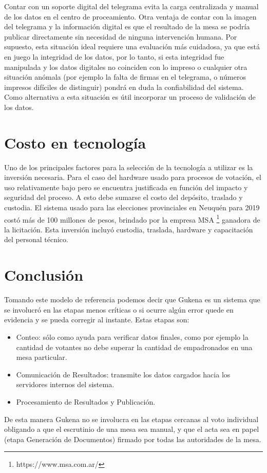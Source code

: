 Contar con un soporte digital del telegrama evita la carga centralizada y manual de los datos en el centro de proceamiento. Otra ventaja de contar con la imagen del telegrama y la información digital es que el resultado de la mesa se podría publicar directamente sin necesidad de ninguna intervención humana. Por supuesto, esta situación ideal requiere una evaluación más cuidadosa, ya que está en juego la integridad de los datos, por lo tanto, si esta integridad fue manipulada y los datos digitales no coinciden con lo impreso o cualquier otra situación anómala (por ejemplo la falta de firmas en el telegrama, o números impresos difíciles de distinguir) pondrá en duda la confiabilidad del sistema. Como alternativa a esta situación es útil incorporar un proceso de validación de los datos.


\section{Costo en tecnología}
Uno de los principales factores para la selección de la tecnología a utilizar es la inversión necesaria. Para el caso del hardware usado para procesos de votación, el uso relativamente bajo pero se encuentra justificada en función del impacto y seguridad del proceso. A esto debe sumarse el costo del depósito, traslado y custodia. \newline
El sistema usado para las elecciones provinciales en Neuquén para 2019 costó más de 100 millones de pesos, brindado por la empresa MSA \footnote{https://www.msa.com.ar/} ganadora de la licitación. Esta inversión incluyó custodia, traslada, hardware y capacitación del personal técnico.\cite{eleccionesNeuquen}

\section{Conclusión}
Tomando este modelo de referencia podemos decir que Gukena es un sistema que se involucró en las etapas menos críticas o si ocurre algún error quede en evidencia y se pueda corregir al instante. Estas etapas son: 
\begin{itemize}
    \item Conteo: sólo como ayuda para verificar datos finales, como por ejemplo la cantidad de votantes no debe superar la cantidad de empadronados en una mesa particular.
    \item Comunicación de Resultados: transmite los datos cargados hacia los servidores internos del sistema.
    \item Procesamiento de Resultados y Publicación.
\end{itemize}
De esta manera Gukena no se involucra en las etapas cercanas al voto individual obligando a que el escrutinio de una mesa sea manual, y que el acta sea en papel (etapa Generación de Documentos) firmado por todas las autoridades de la mesa.
